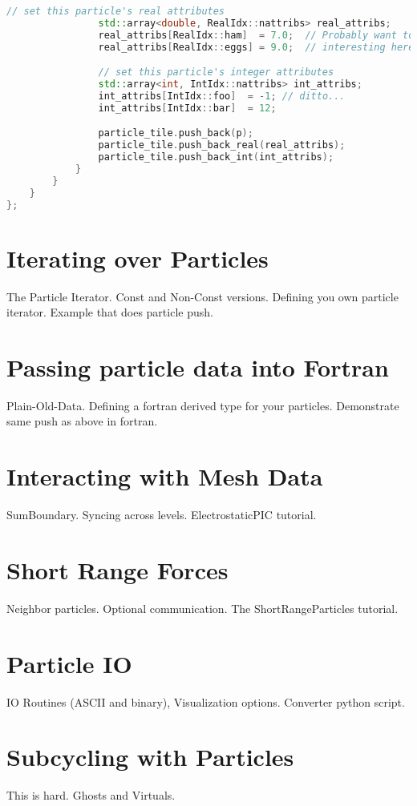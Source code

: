 \begin{lstlisting}[language=cpp]
                // set this particle's real attributes
                std::array<double, RealIdx::nattribs> real_attribs;
                real_attribs[RealIdx::ham]  = 7.0;  // Probably want to do something more... 
                real_attribs[RealIdx::eggs] = 9.0;  // interesting here.

                // set this particle's integer attributes
                std::array<int, IntIdx::nattribs> int_attribs;
                int_attribs[IntIdx::foo]  = -1; // ditto...
                int_attribs[IntIdx::bar]  = 12; 

                particle_tile.push_back(p);
                particle_tile.push_back_real(real_attribs);
                particle_tile.push_back_int(int_attribs);
            }
        }
    }
};

\end{lstlisting}

\section{Iterating over Particles}
\label{sec:Particles:Iterating}

The Particle Iterator. Const and Non-Const versions. Defining you own particle iterator. Example that does particle push.

\section{Passing particle data into Fortran}
\label{sec:Particles:Fortran}

Plain-Old-Data. Defining a fortran derived type for your particles. Demonstrate same push as above in fortran.

\section{Interacting with Mesh Data}
\label{sec:Particles:Interacting}

SumBoundary. Syncing across levels. ElectrostaticPIC tutorial.

\section{Short Range Forces}
\label{sec:Particles:ShortRange}

Neighbor particles. Optional communication. The ShortRangeParticles tutorial.

\section{Particle IO}
\label{sec:Particles:IO}

IO Routines (ASCII and binary), Visualization options. Converter python script.

\section{Subcycling with Particles}
\label{sec:Particles:Subcycling}

This is hard. Ghosts and Virtuals. 

